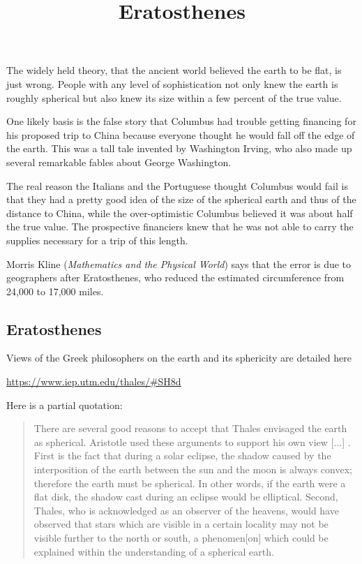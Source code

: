 \documentclass[11pt, oneside]{article}
\title{Eratosthenes}
\date{}
\begin{document}
\maketitle
\Large


The widely held theory, that the ancient world believed the earth to be flat, is just wrong.  People with any level of sophistication not only knew the earth is roughly spherical but also knew its size within a few percent of the true value.

One likely basis is the false story that Columbus had trouble getting financing for his proposed trip to China because everyone thought he would fall off the edge of the earth.  This was a tall tale invented by Washington Irving, who also made up several remarkable fables about George Washington.

The real reason the Italians and the Portuguese thought Columbus would fail is that they had a pretty good idea of the size of the spherical earth and thus of the distance to China, while the over-optimistic Columbus believed it was about half the true value.  The prospective financiers knew that he was not able to carry the supplies necessary for a trip of this length.

Morris Kline (\emph{Mathematics and the Physical World}) says that the error is due to geographers after Eratosthenes, who reduced the estimated circumference from 24,000 to 17,000 miles.

\subsection*{Eratosthenes}

Views of the Greek philosophers on the earth and its sphericity are detailed here

\url{https://www.iep.utm.edu/thales/#SH8d}

Here is a partial quotation:

\begin{quote}
There are several good reasons to accept that Thales envisaged the earth as spherical. Aristotle used these arguments to support his own view [...] . First is the fact that during a solar eclipse, the shadow caused by the interposition of the earth between the sun and the moon is always convex; therefore the earth must be spherical. In other words, if the earth were a flat disk, the shadow cast during an eclipse would be elliptical. Second, Thales, who is acknowledged as an observer of the heavens, would have observed that stars which are visible in a certain locality may not be visible further to the north or south, a phenomen[on] which could be explained within the understanding of a spherical earth.
\end{quote}
\end{document}
